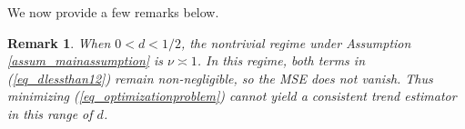 \documentclass[11pt]{article}
\newtheorem{theorem}{Theorem}[section]
\newtheorem{remark}[theorem]{Remark}
\numberwithin{equation}{section}
\numberwithin{figure}{section}
\begin{document}
We now provide a few remarks below.




%
%
\begin{remark}
When $0<d<1/2$, the nontrivial regime under Assumption \ref{assum_mainassumption} is $\nu\asymp1$. In this regime, both terms in (\ref{eq_dlessthan12}) remain non-negligible, so the MSE does not vanish. Thus minimizing (\ref{eq_optimizationproblem}) cannot yield a consistent trend estimator in this range of $d$.

%

%
\end{remark}
\end{document}
